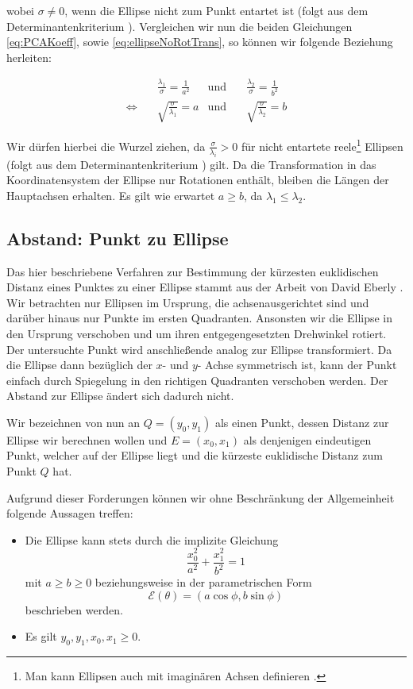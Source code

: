 wobei $\sigma \neq 0$, wenn die Ellipse nicht zum Punkt entartet ist (folgt aus dem Determinantenkriterium \cite{Lawrence1972}). Vergleichen wir nun die beiden Gleichungen \ref{eq:PCAKoeff}, sowie \ref{eq:ellipseNoRotTrans}, so können wir folgende Beziehung herleiten:

\begin{equation}
\begin{aligned}
&\frac{\lambda_1}{\sigma} = \frac{1}{a^2} &\text{und}\quad &\frac{\lambda_2}{\sigma} = \frac{1}{b^2}\\
\Leftrightarrow\quad & \sqrt{\frac{\sigma}{\lambda_1}}  = a  &\text{und}\quad & \sqrt{\frac{\sigma}{\lambda_2}}  = b
\end{aligned}
\end{equation}

Wir dürfen hierbei die Wurzel ziehen, da $\frac{\sigma}{\lambda_i} > 0$ für nicht entartete reele\footnote{Man kann Ellipsen auch mit imaginären Achsen definieren \cite{Lawrence1972}.}  Ellipsen (folgt aus dem Determinantenkriterium \cite{Lawrence1972}) gilt. Da die Transformation in das Koordinatensystem der Ellipse nur Rotationen enthält,  bleiben die Längen der Hauptachsen erhalten. Es gilt wie erwartet $a \geq b$, da $\lambda_1 \leq \lambda_2$.


\subsection{Abstand: Punkt zu Ellipse}
\label{sc:distPointEllipse}
Das hier beschriebene Verfahren zur Bestimmung der kürzesten euklidischen Distanz eines Punktes zu einer Ellipse stammt aus der Arbeit von David Eberly \cite{Eberly2013}.
Wir betrachten nur Ellipsen im Ursprung, die achsenausgerichtet sind und darüber hinaus nur Punkte im ersten Quadranten. Ansonsten wir die Ellipse in den Ursprung verschoben und um ihren entgegengesetzten Drehwinkel rotiert.
Der untersuchte Punkt wird anschließende analog zur Ellipse transformiert.
Da die Ellipse dann bezüglich der $x$- und $y$- Achse symmetrisch ist, kann der Punkt einfach durch Spiegelung in den richtigen Quadranten verschoben werden. Der Abstand zur Ellipse ändert sich dadurch nicht.

Wir bezeichnen von nun an $Q = (y_0, y_1)$ als einen Punkt, dessen Distanz zur Ellipse wir berechnen wollen und $E = (x_0, x_1)$ als denjenigen eindeutigen Punkt, welcher auf der Ellipse liegt und die kürzeste euklidische Distanz zum Punkt $Q$ hat.

Aufgrund dieser Forderungen können wir ohne Beschränkung der Allgemeinheit folgende Aussagen treffen:
\begin{itemize}
	\item Die Ellipse kann stets durch die implizite Gleichung
	\begin{equation}\label{eq:distEqParam} \frac{x_0^2}{a^2} + \frac{x_1^2}{b^2} = 1\end{equation}
	 mit $a \geq b \geq 0$ beziehungsweise
	in der parametrischen Form \[\mathcal{E}(\theta) = (a\cos\phi, b\sin\phi)  \tag*{$\phi \in [0, 2\pi)$}\] beschrieben werden.
	\item Es gilt $y_0,y_1,x_0, x_1 \geq 0$.
\end{itemize}

